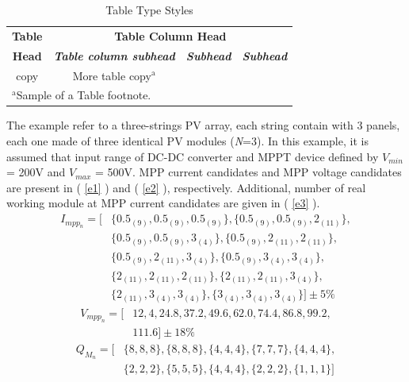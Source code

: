 \documentclass[conference]{IEEEtran}
\begin{document}
\begin{table}[htbp]
\caption{Table Type Styles}
\begin{center}
\begin{tabular}{|c|c|c|c|}
\hline
\textbf{Table}&\multicolumn{3}{|c|}{\textbf{Table Column Head}} \\
\cline{2-4} 
\textbf{Head} & \textbf{\textit{Table column subhead}}& \textbf{\textit{Subhead}}& \textbf{\textit{Subhead}} \\
\hline
copy& More table copy$^{\mathrm{a}}$& &  \\
\hline
\multicolumn{4}{l}{$^{\mathrm{a}}$Sample of a Table footnote.}
\end{tabular}
\label{tab}
\end{center}
\end{table}
The example refer to a three-strings PV array, each string contain with 3 panels, each one made of three identical PV modules (\textit{N}=3). In this example, it is assumed that input range of DC-DC converter and MPPT device defined by \textit{$V_{min}$} = 200V and \textit{$V_{max}$} = 500V. MPP current candidates and MPP voltage candidates are present in ( \ref{e1} ) and ( \ref{e2} ), respectively. Additional, number of real working module at MPP current candidates are given in ( \ref{e3} ).
\begin{equation}
\begin{aligned}
\textit{$I_{mpp_n}$} = [&\{  \text{$0.5_{(9)}$}, \text{$0.5_{(9)}$}, \text{$0.5_{(9)}$}   \}, \{ \text{$0.5_{(9)}$}, \text{$0.5_{(9)}$}, \text{$2_{(11)}$} \},  \\ &\{\text{$0.5_{(9)}$}, \text{$0.5_{(9)}$}, \text{$3_{(4)}$} \}, \{\text{$0.5_{(9)}$}, \text{$2_{(11)}$}, \text{$2_{(11)}$} \}, \\ & \{\text{$0.5_{(9)}$}, \text{$2_{(11)}$}, \text{$3_{(4)}$} \}, \{\text{$0.5_{(9)}$}, \text{$3_{(4)}$}, \text{$3_{(4)}$} \}, \\ &\{\text{$2_{(11)}$}, \text{$2_{(11)}$}, \text{$2_{(11)}$} \}, \{\text{$2_{(11)}$}, \text{$2_{(11)}$}, \text{$3_{(4)}$} \}, \\ & \{\text{$2_{(11)}$}, \text{$3_{(4)}$}, \text{$3_{(4)}$} \}, \{\text{$3_{(4)}$}, \text{$3_{(4)}$}, \text{$3_{(4)}$} \}] \pm 5\%  \label{e1}
\end{aligned}
\end{equation}
\begin{equation}
\begin{aligned}
\textit{$V_{mpp_n}$} = [&12,4, 24.8, 37.2, 49.6, 62.0, 74.4, 86.8, 99.2, \\&111.6] \pm 18\% \label{e2}
\end{aligned}
\end{equation}
\begin{equation}
\begin{aligned}
\textit{$Q_{M_n}$} = [&\{8,8,8\}, \{8,8,8\}, \{4,4,4\}, \{7,7,7\}, \{4,4,4\}, \\&\{2,2,2\}, \{5,5,5\}, \{4,4,4\}, \{2,2,2\}, \{1,1,1\}] \label{e3}
\end{aligned}
\end{equation}
\end{document}

